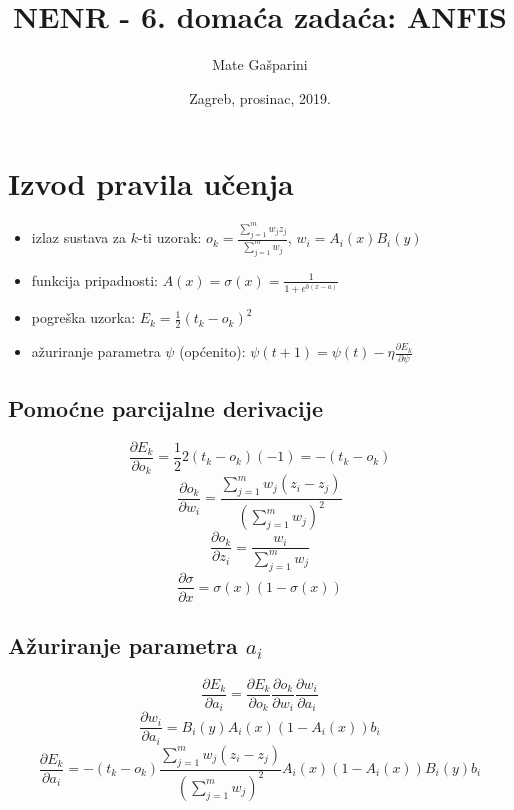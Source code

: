 \documentclass{article}
\title{NENR - 6. domaća zadaća: ANFIS}
\author{Mate Gašparini}
\date{Zagreb, prosinac, 2019.}
\begin{document}
\maketitle

\section{Izvod pravila učenja}

\begin{itemize}
    \item izlaz sustava za $k$-ti uzorak:
    $ o_k = \frac{\sum_{j = 1}^{m}{w_j z_j}}{\sum_{j = 1}^{m}{w_j}} $,
    $ w_i = A_i(x) B_i(y) $
    \item funkcija pripadnosti:
    $ A(x) = \sigma(x) = \frac{1}{1 + e^{b(x - a)}} $
    \item pogreška uzorka:
    $ E_k = \frac{1}{2} (t_k - o_k)^2 $
    \item ažuriranje parametra $ \psi $ (općenito):
    $ \psi(t + 1) = \psi(t) - \eta \frac{\partial E_k}{\partial \psi} $
\end{itemize}

\subsection{Pomoćne parcijalne derivacije}

\begin{equation}
    \frac{\partial E_k}{\partial o_k} =
    \frac{1}{2} 2 (t_k - o_k) (-1) =
    - (t_k - o_k)
\end{equation}
\begin{equation}
    \frac{\partial o_k}{\partial w_i} =
    \frac{\sum_{j = 1}^{m}{w_j (z_i - z_j)}}{(\sum_{j = 1}^{m}{w_j})^2}
\end{equation}
\begin{equation}
    \frac{\partial o_k}{\partial z_i} =
    \frac{w_i}{\sum_{j = 1}^{m}{w_j}}
\end{equation}
\begin{equation}
    \frac{\partial \sigma}{\partial x} =
    \sigma(x) (1 - \sigma(x))
\end{equation}

\subsection{Ažuriranje parametra $ a_i $}

\begin{equation}
    \frac{\partial E_k}{\partial a_i} =
    \frac{\partial E_k}{\partial o_k} \frac{\partial o_k}{\partial w_i} \frac{\partial w_i}{\partial a_i}
\end{equation}
\begin{equation}
    \frac{\partial w_i}{\partial a_i} =
    B_i(y) A_i(x)(1 - A_i(x)) b_i
\end{equation}
\begin{equation}
    \frac{\partial E_k}{\partial a_i} =
    - (t_k - o_k) \frac{\sum_{j = 1}^{m}{w_j (z_i - z_j)}}{(\sum_{j = 1}^{m}{w_j})^2} A_i(x)(1 - A_i(x)) B_i(y) b_i
\end{equation}
\end{document}
